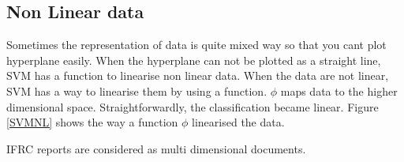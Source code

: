\subsection{Non Linear data} 
Sometimes the representation of data is quite mixed way so that you cant plot hyperplane easily. When the hyperplane can not be plotted as a straight line,  SVM has a function to linearise non linear data.  When the data are not linear, SVM has a way to linearise them by using a function. $ \phi$ maps data to the higher dimensional space. Straightforwardly, the classification became linear. Figure \ref{SVMNL} shows the way a function $ \phi$ linearised the data.

IFRC reports are considered as multi dimensional documents.

 

%
%

